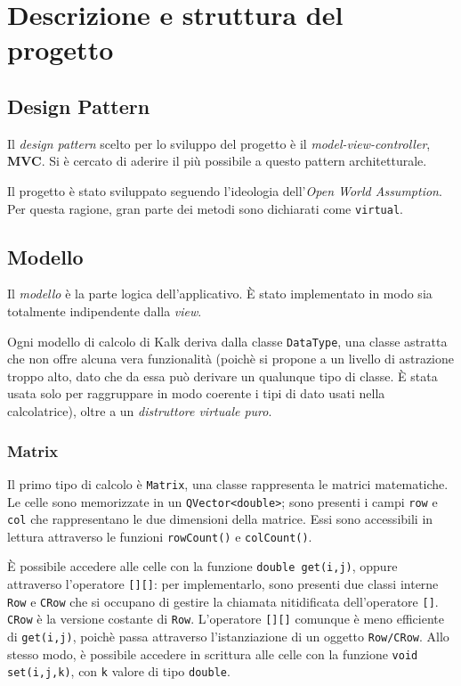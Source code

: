 \section{Descrizione e struttura del progetto}

\subsection{Design Pattern}
Il \emph{design pattern} scelto per lo sviluppo del progetto è il 
\emph{model-view-controller}, \textbf{MVC}. Si è cercato di aderire
il più possibile a questo pattern architetturale. \par
Il progetto è stato sviluppato seguendo l'ideologia dell'\emph{Open World Assumption}.
Per questa ragione, gran parte dei metodi sono dichiarati come \texttt{virtual}.

\subsection{Modello}
Il \emph{modello} è la parte logica dell'applicativo. È stato implementato in
modo sia totalmente indipendente dalla \emph{view}. \par
Ogni modello di calcolo di Kalk deriva dalla classe \texttt{DataType}, una classe
astratta che non offre alcuna vera funzionalità (poichè si propone a un livello di astrazione
troppo alto, dato che da essa può derivare un qualunque tipo di classe. È stata usata solo per
raggruppare in modo coerente i tipi di dato usati nella calcolatrice), oltre a un \emph{distruttore %
virtuale puro}.
\subsubsection{Matrix}
Il primo tipo di calcolo è \texttt{Matrix}, una classe rappresenta le matrici matematiche.
Le celle sono memorizzate in un \texttt{QVector<double>}; sono presenti
i campi \texttt{row} e \texttt{col} che rappresentano le due dimensioni della matrice.
Essi sono accessibili in lettura attraverso le funzioni \texttt{rowCount()} e 
\texttt{colCount()}. \par

È possibile accedere alle celle con la funzione \texttt{double get(i,j)}, 
oppure attraverso l'operatore \texttt{[][]}: per implementarlo, sono presenti due classi interne
\texttt{Row} e \texttt{CRow} che si occupano di gestire la chiamata nitidificata dell'operatore 
\texttt{[]}. \texttt{CRow} è la versione costante di \texttt{Row}. L'operatore \texttt{[][]} comunque è meno
efficiente di \texttt{get(i,j)}, poichè passa attraverso l'istanziazione di un oggetto \texttt{Row/CRow}.
Allo stesso modo, è possibile accedere in scrittura alle celle con la funzione \mbox{\texttt{void set(i,j,k)}}, con 
\texttt{k} valore di tipo \texttt{double}.

